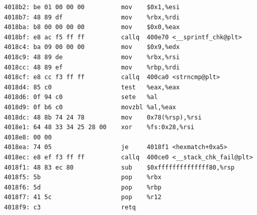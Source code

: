 \documentclass[12pt, a4paper, oneside]{ctexart}
\begin{document}
\begin{itemize}
\begin{lstlisting}
4018b2:	be 01 00 00 00       	mov    $0x1,%esi
4018b7:	48 89 df             	mov    %rbx,%rdi
4018ba:	b8 00 00 00 00       	mov    $0x0,%eax
4018bf:	e8 ac f5 ff ff       	callq  400e70 <__sprintf_chk@plt>
4018c4:	ba 09 00 00 00       	mov    $0x9,%edx
4018c9:	48 89 de             	mov    %rbx,%rsi
4018cc:	48 89 ef             	mov    %rbp,%rdi
4018cf:	e8 cc f3 ff ff       	callq  400ca0 <strncmp@plt>
4018d4:	85 c0                	test   %eax,%eax
4018d6:	0f 94 c0             	sete   %al
4018d9:	0f b6 c0             	movzbl %al,%eax
4018dc:	48 8b 74 24 78       	mov    0x78(%rsp),%rsi
4018e1:	64 48 33 34 25 28 00 	xor    %fs:0x28,%rsi
4018e8:	00 00 
4018ea:	74 05                	je     4018f1 <hexmatch+0xa5>
4018ec:	e8 ef f3 ff ff       	callq  400ce0 <__stack_chk_fail@plt>
4018f1:	48 83 ec 80          	sub    $0xffffffffffffff80,%rsp
4018f5:	5b                   	pop    %rbx
4018f6:	5d                   	pop    %rbp
4018f7:	41 5c                	pop    %r12
4018f9:	c3                   	retq   


\end{lstlisting}
\end{itemize}
\end{document}
